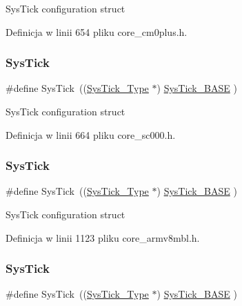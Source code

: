 Sys\+Tick configuration struct 

Definicja w linii 654 pliku core\+\_\+cm0plus.\+h.

\mbox{\label{group___c_m_s_i_s__core__base_gacd96c53beeaff8f603fcda425eb295de}} 
\subsubsection{\texorpdfstring{Sys\+Tick}{SysTick}\hspace{0.1cm}{\footnotesize\ttfamily [4/12]}}
{\footnotesize\ttfamily \#define Sys\+Tick~((\hyperlink{struct_sys_tick___type}{Sys\+Tick\+\_\+\+Type}   $\ast$)     \hyperlink{group___c_m_s_i_s__core__base_ga58effaac0b93006b756d33209e814646}{Sys\+Tick\+\_\+\+B\+A\+SE}  )}

Sys\+Tick configuration struct 

Definicja w linii 664 pliku core\+\_\+sc000.\+h.

\mbox{\label{group___c_m_s_i_s__core__base_gacd96c53beeaff8f603fcda425eb295de}} 
\subsubsection{\texorpdfstring{Sys\+Tick}{SysTick}\hspace{0.1cm}{\footnotesize\ttfamily [5/12]}}
{\footnotesize\ttfamily \#define Sys\+Tick~((\hyperlink{struct_sys_tick___type}{Sys\+Tick\+\_\+\+Type}   $\ast$)     \hyperlink{group___c_m_s_i_s__core__base_ga58effaac0b93006b756d33209e814646}{Sys\+Tick\+\_\+\+B\+A\+SE}     )}

Sys\+Tick configuration struct 

Definicja w linii 1123 pliku core\+\_\+armv8mbl.\+h.

\mbox{\label{group___c_m_s_i_s__core__base_gacd96c53beeaff8f603fcda425eb295de}} 
\subsubsection{\texorpdfstring{Sys\+Tick}{SysTick}\hspace{0.1cm}{\footnotesize\ttfamily [6/12]}}
{\footnotesize\ttfamily \#define Sys\+Tick~((\hyperlink{struct_sys_tick___type}{Sys\+Tick\+\_\+\+Type}   $\ast$)     \hyperlink{group___c_m_s_i_s__core__base_ga58effaac0b93006b756d33209e814646}{Sys\+Tick\+\_\+\+B\+A\+SE}     )}

